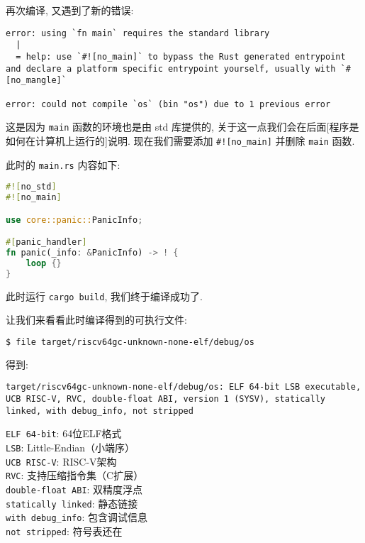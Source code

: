 \documentclass{ctexart}
\begin{document}
再次编译, 又遇到了新的错误:
\begin{lstlisting}
error: using `fn main` requires the standard library
  |
  = help: use `#![no_main]` to bypass the Rust generated entrypoint and declare a platform specific entrypoint yourself, usually with `#[no_mangle]`

error: could not compile `os` (bin "os") due to 1 previous error
\end{lstlisting}
这是因为 \verb|main| 函数的环境也是由 std 库提供的,
关于这一点我们会在后面[程序是如何在计算机上运行的]说明.
现在我们需要添加 \verb|#![no_main]| 并删除 \verb|main| 函数.

此时的 \verb|main.rs| 内容如下:
\begin{lstlisting}[language=rust]
#![no_std]
#![no_main]

use core::panic::PanicInfo;

#[panic_handler]
fn panic(_info: &PanicInfo) -> ! {
    loop {}
}
\end{lstlisting}

此时运行 \verb|cargo build|, 我们终于编译成功了.

让我们来看看此时编译得到的可执行文件:
\begin{lstlisting}[language=bash]
$ file target/riscv64gc-unknown-none-elf/debug/os
\end{lstlisting}
得到:
\begin{lstlisting}
target/riscv64gc-unknown-none-elf/debug/os: ELF 64-bit LSB executable, UCB RISC-V, RVC, double-float ABI, version 1 (SYSV), statically linked, with debug_info, not stripped
\end{lstlisting}
\verb|ELF 64-bit|: 64位ELF格式\\
\verb|LSB|: Little-Endian（小端序）\\
\verb|UCB RISC-V|: RISC-V架构\\
\verb|RVC|: 支持压缩指令集（C扩展）\\
\verb|double-float ABI|: 双精度浮点\\
\verb|statically linked|: 静态链接\\
\verb|with debug_info|: 包含调试信息\\
\verb|not stripped|: 符号表还在
\end{document}
